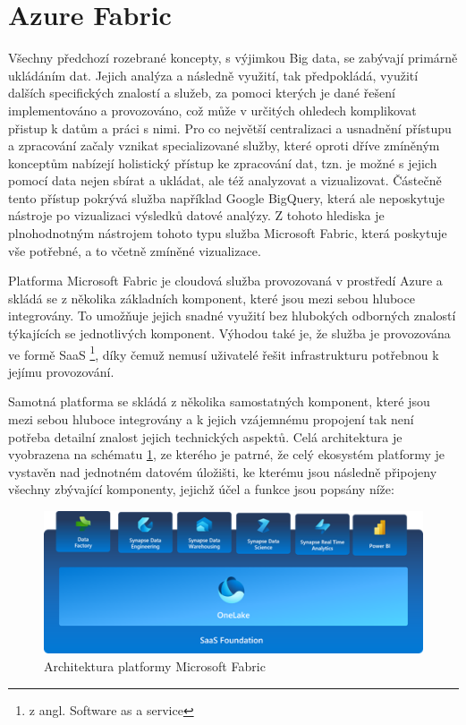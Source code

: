\documentclass[
  digital,     %
  twoside,     %
  lof,         %
  lot,         %
]{fithesis4}
\begin{document}
\section{Azure Fabric}
Všechny předchozí rozebrané koncepty, s výjimkou Big data, se zabývají primárně ukládáním dat. Jejich analýza a následně využití, tak předpokládá, využití dalších specifických znalostí a služeb, za pomoci kterých je dané řešení implementováno a provozováno, což může v určitých ohledech komplikovat přistup k datům a práci s nimi. Pro co největší centralizaci a usnadnění přístupu a zpracování začaly vznikat specializované služby, které oproti dříve zmíněným konceptům nabízejí holistický přístup ke zpracování dat, tzn. je možné s jejich pomocí data nejen sbírat a ukládat, ale též analyzovat a vizualizovat. Částečně  tento přístup pokrývá služba například  Google BigQuery, která ale neposkytuje nástroje po vizualizaci výsledků datové analýzy.\parencite{googleBigQuery} Z tohoto hlediska je plnohodnotným nástrojem tohoto typu služba Microsoft Fabric, která poskytuje vše potřebné, a to včetně zmíněné vizualizace.\parencite{Buck2023}

Platforma Microsoft Fabric je cloudová služba provozovaná v prostředí Azure a skládá se z několika základních komponent, které jsou mezi sebou hluboce integrovány. To umožňuje jejich snadné využití bez hlubokých odborných znalostí týkajících se jednotlivých komponent. Výhodou také je, že služba je provozována ve formě SaaS \footnote{z angl. Software as a service}, díky čemuž nemusí uživatelé řešit infrastrukturu potřebnou k jejímu provozování.\parencite{Buck2023}

Samotná platforma se skládá z několika samostatných komponent, které jsou mezi sebou hluboce integrovány a k jejich vzájemnému propojení tak není potřeba detailní znalost jejich technických aspektů. Celá architektura je vyobrazena na schématu \ref{fig:fabric_architecture}, ze kterého je patrné, že celý ekosystém platformy je vystavěn nad jednotném datovém úložišti, ke kterému jsou následně připojeny všechny zbývající komponenty, jejichž účel a funkce jsou popsány níže:


\begin{figure}[h]
  \begin{center}
          \includegraphics[width=12cm]{img/fabric.png}
  \end{center}
  \caption{Architektura platformy Microsoft Fabric \parencite{Buck2023}}
  \label{fig:fabric_architecture}
\end{figure}  
\end{document}
